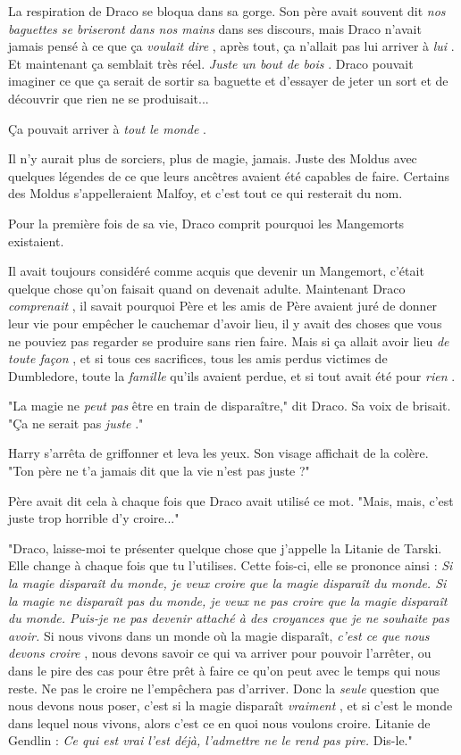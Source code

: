 La respiration de Draco se bloqua dans sa gorge. Son père avait souvent dit \emph{nos baguettes se briseront dans nos mains}  dans ses discours, mais Draco n'avait jamais pensé à ce que ça \emph{voulait dire} , après tout, ça n'allait pas lui arriver à \emph{lui} . Et maintenant ça semblait très réel. \emph{Juste un bout de bois} . Draco pouvait imaginer ce que ça serait de sortir sa baguette et d'essayer de jeter un sort et de découvrir que rien ne se produisait...

Ça pouvait arriver à \emph{tout le monde} .

Il n'y aurait plus de sorciers, plus de magie, jamais. Juste des Moldus avec quelques légendes de ce que leurs ancêtres avaient été capables de faire. Certains des Moldus s'appelleraient Malfoy, et c'est tout ce qui resterait du nom.

Pour la première fois de sa vie, Draco comprit pourquoi les Mangemorts existaient.

Il avait toujours considéré comme acquis que devenir un Mangemort, c'était quelque chose qu'on faisait quand on devenait adulte. Maintenant Draco \emph{comprenait} , il savait pourquoi Père et les amis de Père avaient juré de donner leur vie pour empêcher le cauchemar d'avoir lieu, il y avait des choses que vous ne pouviez pas regarder se produire sans rien faire. Mais si ça allait avoir lieu \emph{de toute façon} , et si tous ces sacrifices, tous les amis perdus victimes de Dumbledore, toute la \emph{famille}  qu'ils avaient perdue, et si tout avait été pour \emph{rien} .

"La magie ne \emph{peut pas}  être en train de disparaître," dit Draco. Sa voix de brisait. "Ça ne serait pas \emph{juste} ."

Harry s'arrêta de griffonner et leva les yeux. Son visage affichait de la colère. "Ton père ne t'a jamais dit que la vie n'est pas juste ?"

Père avait dit cela à chaque fois que Draco avait utilisé ce mot. "Mais, mais, c'est juste trop horrible d'y croire..."

"Draco, laisse-moi te présenter quelque chose que j'appelle la Litanie de Tarski. Elle change à chaque fois que tu l'utilises. Cette fois-ci, elle se prononce ainsi : \emph{Si la magie disparaît du monde, je veux croire que la magie disparaît du monde. Si la magie ne disparaît pas du monde, je veux ne pas croire que la magie disparaît du monde. Puis-je ne pas devenir attaché à des croyances que je ne souhaite pas avoir. } Si nous vivons dans un monde où la magie disparaît, \emph{c'est ce que nous devons croire} , nous devons savoir ce qui va arriver pour pouvoir l'arrêter, ou dans le pire des cas pour être prêt à faire ce qu'on peut avec le temps qui nous reste. Ne pas le croire ne l'empêchera pas d'arriver. Donc la \emph{seule}  question que nous devons nous poser, c'est si la magie disparaît \emph{vraiment} , et si c'est le monde dans lequel nous vivons, alors c'est ce en quoi nous voulons croire. Litanie de Gendlin : \emph{Ce qui est vrai l'est déjà, l'admettre ne le rend pas pire. } Dis-le."

